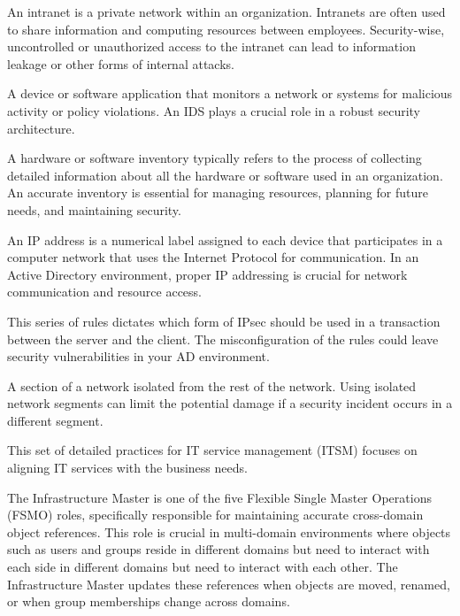  An intranet is a private network within an organization. Intranets are often used to share information and computing resources between employees. Security-wise, uncontrolled or unauthorized access to the intranet can lead to information leakage or other forms of internal attacks.

 A device or software application that monitors a network or systems for malicious activity or policy violations. An IDS plays a crucial role in a robust security architecture.

 A hardware or software inventory typically refers to the process of collecting detailed information about all the hardware or software used in an organization. An accurate inventory is essential for managing resources, planning for future needs, and maintaining security.

 An IP address is a numerical label assigned to each device that participates in a computer network that uses the Internet Protocol for communication. In an Active Directory environment, proper IP addressing is crucial for network communication and resource access.

 This series of rules dictates which form of IPsec should be used in a transaction between the server and the client. The misconfiguration of the rules could leave security vulnerabilities in your AD environment.

 A section of a network isolated from the rest of the network. Using isolated network segments can limit the potential damage if a security incident occurs in a different segment.

 This set of detailed practices for IT service management (ITSM) focuses on aligning IT services with the business needs.

 The Infrastructure Master is one of the five Flexible Single Master Operations (FSMO) roles, specifically responsible for maintaining accurate cross-domain object references. This role is crucial in multi-domain environments where objects such as users and groups reside in different domains but need to interact with each side in different domains but need to interact with each other. The Infrastructure Master updates these references when objects are moved, renamed, or when group memberships change across domains.

